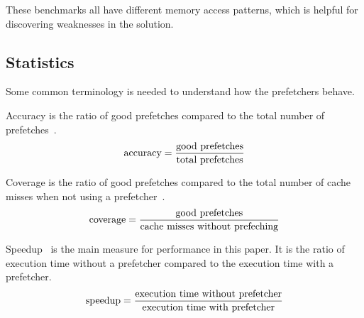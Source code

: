 These benchmarks all have different memory access patterns, which is
helpful for discovering weaknesses in the solution.

\subsection{Statistics}
Some common terminology is needed to understand how the prefetchers
behave.

Accuracy is the ratio of good prefetches compared to the total number
of prefetches~\cite{m5userdoc}.
\begin{equation*}
  \label{eq:acc}
  \textnormal{accuracy} = \frac{\textnormal{good prefetches}}{\textnormal{total prefetches}}
\end{equation*}

Coverage is the ratio of good prefetches compared to the total number
of cache misses when not using a prefetcher~\cite{m5userdoc}.
\begin{equation*}
  \textnormal{coverage}=\frac{\textnormal{good prefetches}}{\textnormal{cache misses without prefeching}}
\end{equation*}

Speedup~\cite{m5userdoc} is the main measure for performance in this
paper. It is the ratio of execution time without a prefetcher compared
to the execution time with a prefetcher.
\begin{equation*}
  \textnormal{speedup}=\frac{\textnormal{execution time without
      prefetcher}}{\textnormal{execution time with prefetcher}}
\end{equation*}
